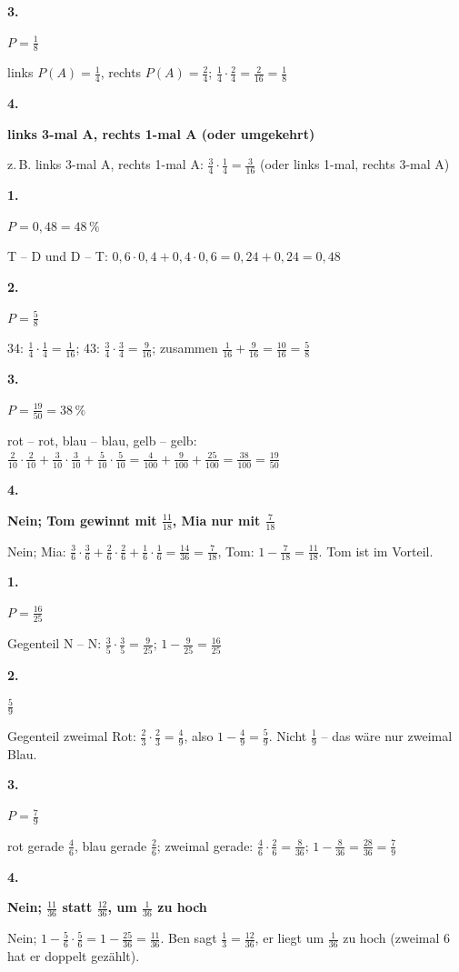 \documentclass[11pt]{article}
\newcommand{\lsg}[3]{\par\noindent\begin{minipage}[t]{9mm}\textbf{#1}\end{minipage}%
  \begin{minipage}[t]{52mm}\raggedright\bfseries\boldmath #2\end{minipage}\hspace{3mm}%
  \begin{minipage}[t]{\dimexpr\linewidth-64mm\relax}\raggedright\small #3\end{minipage}\par\vspace{4pt}}
\begin{document}
\lsg{3.}{$P = \frac{1}{8}$}{links $P(A) = \frac{1}{4}$, rechts $P(A) = \frac{2}{4}$; $\frac{1}{4} \cdot \frac{2}{4} = \frac{2}{16} = \frac{1}{8}$}
\lsg{4.}{links 3-mal A, rechts 1-mal A (oder umgekehrt)}{z.\,B. links 3-mal A, rechts 1-mal A: $\frac{3}{4} \cdot \frac{1}{4} = \frac{3}{16}$ (oder links 1-mal, rechts 3-mal A)}
\par\Needspace{25mm}\vspace{6pt}\noindent\colorbox{black!12}{}\hspace{2mm}{\bfseries Mehrere Pfade: plus}\par\vspace{4pt}
\lsg{1.}{$P = 0{,}48 = 48\,\%$}{T – D und D – T: $0{,}6 \cdot 0{,}4 + 0{,}4 \cdot 0{,}6 = 0{,}24 + 0{,}24 = 0{,}48$}
\lsg{2.}{$P = \frac{5}{8}$}{34: $\frac{1}{4} \cdot \frac{1}{4} = \frac{1}{16}$; 43: $\frac{3}{4} \cdot \frac{3}{4} = \frac{9}{16}$; zusammen $\frac{1}{16} + \frac{9}{16} = \frac{10}{16} = \frac{5}{8}$}
\lsg{3.}{$P = \frac{19}{50} = 38\,\%$}{rot – rot, blau – blau, gelb – gelb: $\frac{2}{10} \cdot \frac{2}{10} + \frac{3}{10} \cdot \frac{3}{10} + \frac{5}{10} \cdot \frac{5}{10} = \frac{4}{100} + \frac{9}{100} + \frac{25}{100} = \frac{38}{100} = \frac{19}{50}$}
\lsg{4.}{Nein; Tom gewinnt mit $\frac{11}{18}$, Mia nur mit $\frac{7}{18}$}{Nein; Mia: $\frac{3}{6} \cdot \frac{3}{6} + \frac{2}{6} \cdot \frac{2}{6} + \frac{1}{6} \cdot \frac{1}{6} = \frac{14}{36} = \frac{7}{18}$, Tom: $1 - \frac{7}{18} = \frac{11}{18}$. Tom ist im Vorteil.}
\par\Needspace{25mm}\vspace{6pt}\noindent\colorbox{black!12}{}\hspace{2mm}{\bfseries Mindestens einmal: über das Gegenteil}\par\vspace{4pt}
\lsg{1.}{$P = \frac{16}{25}$}{Gegenteil N – N: $\frac{3}{5} \cdot \frac{3}{5} = \frac{9}{25}$; $1 - \frac{9}{25} = \frac{16}{25}$}
\lsg{2.}{$\frac{5}{9}$}{Gegenteil zweimal Rot: $\frac{2}{3} \cdot \frac{2}{3} = \frac{4}{9}$, also $1 - \frac{4}{9} = \frac{5}{9}$. Nicht $\frac{1}{9}$ – das wäre nur zweimal Blau.}
\lsg{3.}{$P = \frac{7}{9}$}{rot gerade $\frac{4}{6}$, blau gerade $\frac{2}{6}$; zweimal gerade: $\frac{4}{6} \cdot \frac{2}{6} = \frac{8}{36}$; $1 - \frac{8}{36} = \frac{28}{36} = \frac{7}{9}$}
\lsg{4.}{Nein; $\frac{11}{36}$ statt $\frac{12}{36}$, um $\frac{1}{36}$ zu hoch}{Nein; $1 - \frac{5}{6} \cdot \frac{5}{6} = 1 - \frac{25}{36} = \frac{11}{36}$. Ben sagt $\frac{1}{3} = \frac{12}{36}$, er liegt um $\frac{1}{36}$ zu hoch (zweimal 6 hat er doppelt gezählt).}
\end{document}
